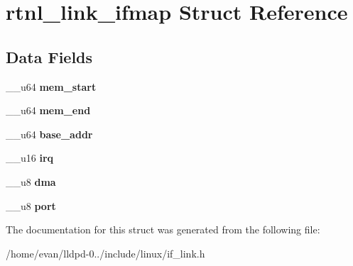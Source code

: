 \section{rtnl\-\_\-link\-\_\-ifmap \-Struct \-Reference}
\label{structrtnl__link__ifmap}
\subsection*{\-Data \-Fields}
\begin{DoxyCompactItemize}
\item 
\-\_\-\-\_\-u64 {\bfseries mem\-\_\-start}\label{structrtnl__link__ifmap_a0ffe7bdae98add75792d07127423049f}

\item 
\-\_\-\-\_\-u64 {\bfseries mem\-\_\-end}\label{structrtnl__link__ifmap_abde06700020b4c09ae9515a8747c8f50}

\item 
\-\_\-\-\_\-u64 {\bfseries base\-\_\-addr}\label{structrtnl__link__ifmap_a0410614bb527e80dab8be27ee38873e2}

\item 
\-\_\-\-\_\-u16 {\bfseries irq}\label{structrtnl__link__ifmap_ac8e39c327458298ecd83d6ad235344c1}

\item 
\-\_\-\-\_\-u8 {\bfseries dma}\label{structrtnl__link__ifmap_a2bef7bd0e5153c0c3e92588bfd68394e}

\item 
\-\_\-\-\_\-u8 {\bfseries port}\label{structrtnl__link__ifmap_aacc3344d64d8bf00e8e33f831f2d4919}

\end{DoxyCompactItemize}


\-The documentation for this struct was generated from the following file\-:\begin{DoxyCompactItemize}
\item 
/home/evan/lldpd-\/0../include/linux/if\-\_\-link.\-h\end{DoxyCompactItemize}
